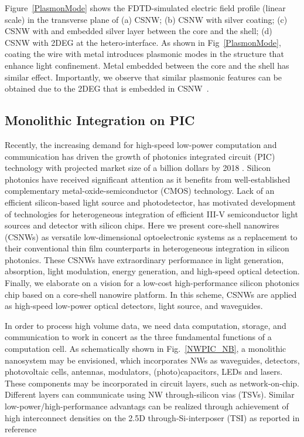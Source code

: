 Figure~\ref{PlasmonMode} shows the FDTD-simulated electric field profile
(linear scale) in the transverse plane of (a) CSNW; (b) CSNW with silver
coating; (c) CSNW with and embedded silver layer between the core and the
shell; (d) CSNW with 2DEG at the hetero-interface. As shown in
Fig~\ref{PlasmonMode}, coating the wire with metal introduces plasmonic modes
in the structure that enhance light confinement. Metal embedded between the
core and the shell has similar effect. Importantly, we observe that similar
plasmonic features can be obtained due to the 2DEG that is embedded in
CSNW~\cite{montazeri2016plasmonic}.

\subsection{Monolithic Integration on PIC}

Recently, the increasing demand for high-speed low-power computation and
communication has driven the growth of photonics integrated circuit
(PIC) technology with projected market size of a billion dollars by 2018
. Silicon photonics have received significant attention as it
benefits from well-established complementary metal-oxide-semiconductor
(CMOS) technology. Lack of an efficient silicon-based light source and
photodetector, has motivated development of technologies for
heterogeneous integration of efficient III-V semiconductor light sources
and detector with silicon chips. Here we present core-shell
nanowires (CSNWs) as versatile low-dimensional optoelectronic systems as
a replacement to their conventional thin film counterparts in
heterogeneous integration in silicon photonics. These CSNWs have
extraordinary performance in light generation, absorption, light
modulation, energy generation, and high-speed optical detection.
Finally, we elaborate on a vision for a low-cost high-performance
silicon photonics chip based on a core-shell nanowire platform. In this
scheme, CSNWs are applied as high-speed low-power optical detectors,
light source, and waveguides.

In order to process high volume data,
we need data computation, storage, and communication to work in concert as the
three fundamental functions of a computation cell. As schematically shown in
Fig.~\ref{NWPIC_NB}, a monolithic nanosystem may be envisioned, which
incorporates NWs as waveguides, detectors, photovoltaic cells, antennas,
modulators, (photo)capacitors, LEDs and lasers. These components may be
incorporated in circuit layers, such as network-on-chip. Different layers can
communicate using NW through-silicon vias (TSVs). Similar
low-power/high-performance advantags can be realized through achievement of
high interconnect densities on the 2.5D through-Si-interposer (TSI) as reported
in reference~\cite{Zhang:2015ec} 

